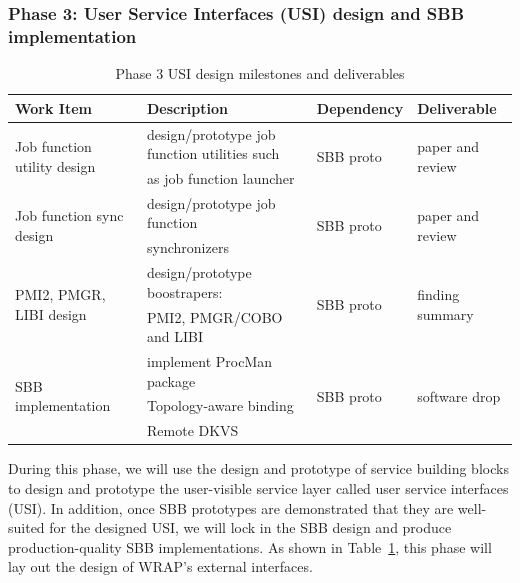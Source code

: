 \subsubsection{Phase 3: User Service Interfaces (USI) design and SBB implementation}
\begin{table}
\centering
\begin{tabular}{|l|l|l|l|}
\hline
Work Item & Description & Dependency & Deliverable \\
\hline
\multirow{2}{*}{Job function utility design} & design/prototype job function utilities such & \multirow{2}{*}{SBB proto} & \multirow{2}{*}{paper and review} \\
& as job function launcher & & \\ \hline
\multirow{2}{*}{Job function sync design} & design/prototype job function & \multirow{2}{*}{SBB proto} & \multirow{2}{*}{paper and review} \\
& synchronizers & & \\ \hline
\multirow{2}{*}{PMI2, PMGR, LIBI design} & design/prototype boostrapers: & \multirow{2}{*}{SBB proto} & \multirow{2}{*}{finding summary} \\
& PMI2, PMGR/COBO and LIBI & & \\ \hline
\multirow{3}{*}{SBB implementation} & implement ProcMan package & \multirow{3}{*}{SBB proto} & \multirow{3}{*}{software drop} \\
& Topology-aware binding & & \\
& Remote DKVS & & \\ \hline
\end{tabular}
\caption{Phase 3 USI design milestones and deliverables}
\label{tab:phase3}
\end{table}

During this phase, we will use the design and prototype of service building blocks
to design and prototype the user-visible service layer called user service interfaces (USI).
In addition, once SBB prototypes are demonstrated that they are well-suited for the designed USI,
we will lock in the SBB design and produce production-quality SBB implementations.
As shown in Table~\ref{tab:phase3},
this phase will lay out the design of WRAP's external interfaces.

